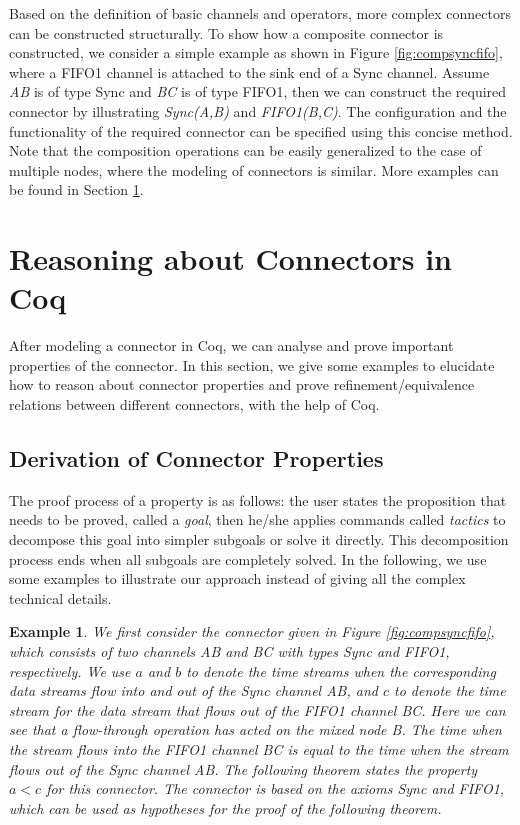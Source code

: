 \documentclass[preprint,3p]{elsarticle}
\newtheorem{example}{Example}[section]
\begin{document}
Based on the definition of basic channels and operators, more complex connectors can be constructed structurally.
To show how a composite connector is constructed, we consider a simple example as shown in Figure \ref{fig:compsyncfifo}, where a FIFO1 channel is attached
to the sink end of a Sync channel. Assume \emph{AB} is of type Sync and \emph{BC} is of type FIFO1, then we can construct the required connector by
illustrating \emph{Sync(A,B)} and \emph{FIFO1(B,C)}. The configuration and the functionality of the required connector can be specified using this concise method. Note that the composition operations can be easily generalized to the case of multiple nodes, where the modeling of connectors is similar. More
examples can be found in Section \ref{sec:verification}.






\section{Reasoning about Connectors in Coq}\label{sec:verification}
After modeling a connector in Coq, we can analyse and prove important properties of the connector. In this section, we give some examples to elucidate how to
reason about connector properties and prove refinement/equivalence relations between different connectors, with the help of Coq.


\subsection{Derivation of Connector Properties}
The proof process of a property is as follows: the user states the proposition that needs to be proved, called a \emph{goal},
then he/she applies commands called \emph{tactics} to decompose this goal into simpler subgoals or solve it directly. This decomposition
process ends when all subgoals are completely solved. In the following, we use some examples to illustrate our approach instead of
giving all the complex technical details.
\begin{example}
We first consider the connector given in Figure \ref{fig:compsyncfifo}, which consists of two channels \emph{AB} and \emph{BC} with types Sync and FIFO1, respectively.
We use $a$ and $b$ to denote the time streams when the corresponding data streams flow into and out of the Sync channel \emph{AB}, and
$c$ to denote the time stream for the data stream that flows out of the FIFO1 channel \emph{BC}. Here we can see that a flow-through
operation has acted on the mixed node \emph{B}. The time when the stream flows into the FIFO1 channel \emph{BC} is equal to the time when the
stream flows out of the Sync channel \emph{AB}. The following theorem states the property $a < c$ for this connector. The connector is based on the
axioms Sync and FIFO1, which can be used as hypotheses for the proof of the following theorem.
\end{example}
\end{document}
